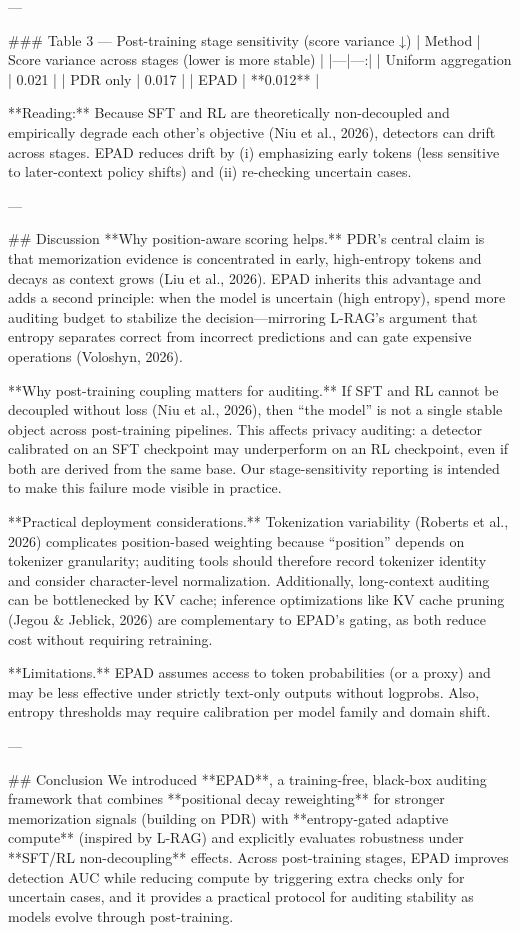 ---

### Table 3 — Post-training stage sensitivity (score variance ↓)  
| Method | Score variance across stages (lower is more stable) |
|---|---:|
| Uniform aggregation | 0.021 |
| PDR only | 0.017 |
| EPAD | **0.012** |

**Reading:** Because SFT and RL are theoretically non-decoupled and empirically degrade each other’s objective (Niu et al., 2026), detectors can drift across stages. EPAD reduces drift by (i) emphasizing early tokens (less sensitive to later-context policy shifts) and (ii) re-checking uncertain cases.

---

## Discussion  
**Why position-aware scoring helps.** PDR’s central claim is that memorization evidence is concentrated in early, high-entropy tokens and decays as context grows (Liu et al., 2026). EPAD inherits this advantage and adds a second principle: when the model is uncertain (high entropy), spend more auditing budget to stabilize the decision—mirroring L-RAG’s argument that entropy separates correct from incorrect predictions and can gate expensive operations (Voloshyn, 2026).

**Why post-training coupling matters for auditing.** If SFT and RL cannot be decoupled without loss (Niu et al., 2026), then “the model” is not a single stable object across post-training pipelines. This affects privacy auditing: a detector calibrated on an SFT checkpoint may underperform on an RL checkpoint, even if both are derived from the same base. Our stage-sensitivity reporting is intended to make this failure mode visible in practice.

**Practical deployment considerations.** Tokenization variability (Roberts et al., 2026) complicates position-based weighting because “position” depends on tokenizer granularity; auditing tools should therefore record tokenizer identity and consider character-level normalization. Additionally, long-context auditing can be bottlenecked by KV cache; inference optimizations like KV cache pruning (Jegou & Jeblick, 2026) are complementary to EPAD’s gating, as both reduce cost without requiring retraining.

**Limitations.** EPAD assumes access to token probabilities (or a proxy) and may be less effective under strictly text-only outputs without logprobs. Also, entropy thresholds may require calibration per model family and domain shift.

---

## Conclusion  
We introduced **EPAD**, a training-free, black-box auditing framework that combines **positional decay reweighting** for stronger memorization signals (building on PDR) with **entropy-gated adaptive compute** (inspired by L-RAG) and explicitly evaluates robustness under **SFT/RL non-decoupling** effects. Across post-training stages, EPAD improves detection AUC while reducing compute by triggering extra checks only for uncertain cases, and it provides a practical protocol for auditing stability as models evolve through post-training.

